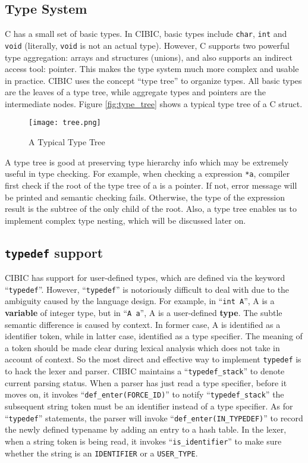 \documentclass[10pt, a4paper]{article}
\begin{document}
\subsection{Type System}
C has a small set of basic types. In CIBIC, basic types include \texttt{char},
\texttt{int} and \texttt{void} (literally, \texttt{void} is not an actual
type). However, C supports two powerful type aggregation: arrays and structures
(unions), and also supports an indirect access tool: pointer. This makes the
type system much more complex and usable in practice. CIBIC uses the concept
``type tree'' to organize types. All basic types are the leaves of a type tree,
while aggregate types and pointers are the intermediate nodes. Figure
\ref{fig:type_tree} shows a typical type tree of a C struct.

\begin{figure}
    \centering
    \texttt{[image: tree.png]}
    \caption{A Typical Type Tree}
\end{figure}

A type tree is good at preserving type hierarchy info which may be extremely
useful in type checking. For example, when checking a expression \texttt{*a},
compiler first check if the root of the type tree of a is a pointer. If not,
error message will be printed and semantic checking fails. Otherwise, the type
of the expression result is the subtree of the only child of the root. Also, a
type tree enables us to implement complex type nesting, which will be discussed
later on.
\subsection{\texttt{typedef} support}
CIBIC has support for user-defined types, which are defined via the keyword
``\texttt{typedef}''.  However, ``\texttt{typedef}'' is notoriously difficult
to deal with due to the ambiguity caused by the language design. For example,
in ``\texttt{int A}'', A is a \textbf{variable} of integer type, but in
``\texttt{A a}'', A is a user-defined \textbf{type}. The subtle semantic
difference is caused by context. In former case, A is identified as a
identifier token, while in latter case, identified as a type specifier. The
meaning of a token should be made clear during lexical analysis which does not
take in account of context. So the most direct and effective way to implement
\texttt{typedef} is to hack the lexer and parser. CIBIC maintains a
``\texttt{typedef\_stack}'' to denote current parsing status. When a parser has
just read a type specifier, before it moves on, it invokes
``\texttt{def\_enter(FORCE\_ID)}'' to notify ``\texttt{typedef\_stack}'' the
subsequent string token must be an identifier instead of a type specifier. As
for ``\texttt{typedef}'' statements, the parser will invoke
``\texttt{def\_enter(IN\_TYPEDEF)}'' to record the newly defined typename by
adding an entry to a hash table. In the lexer, when a string token is being
read, it invokes ``\texttt{is\_identifier}'' to make sure whether the string is
an \texttt{IDENTIFIER} or a \texttt{USER\_TYPE}.
\end{document}
